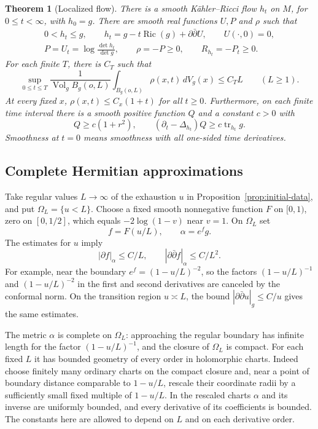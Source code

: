 \documentclass[11pt]{article}
\newtheorem{theorem}{Theorem}[section]
\theoremstyle{definition}
\theoremstyle{remark}
\newcommand{\dd}{\partial\bar\partial}
\DeclareMathOperator{\Ric}{Ric}
\DeclareMathOperator{\tr}{tr}
\DeclareMathOperator{\Vol}{Vol}
\numberwithin{equation}{section}
\begin{document}
\begin{theorem}[Localized flow]\label{thm:localized-flow}
There is a smooth K\"ahler--Ricci flow $h_t$ on $M$, for
$0\le t<\infty$, with $h_0=g$.  There are smooth real functions $U,P$
and $\rho$ such that
\begin{equation}\label{flow:identities}
 \begin{gathered}
 0<h_t\le g,\qquad
 h_t=g-t\Ric(g)+\dd U,\qquad U(\cdot,0)=0,\\
 P=U_t=\log\frac{\det h_t}{\det g},\qquad
 \rho=-P\ge0,\qquad R_{h_t}=-P_t\ge0.
 \end{gathered}
\end{equation}
For each finite $T$, there is $C_T$ such that
\begin{equation}\label{flow:rho-average}
 \sup_{0\le t\le T}
 \frac{1}{\Vol_gB_g(o,L)}\int_{B_g(o,L)}\rho(x,t)\,dV_g(x)
 \le C_TL\qquad(L\ge1).
\end{equation}
At every fixed $x$, $\rho(x,t)\le C_x(1+t)$ for all $t\ge0$.
Furthermore, on each finite time interval there is a smooth positive
function $Q$ and a constant $c>0$ with
\begin{equation}\label{flow:proper-supercaloric}
 Q\ge c(1+r^2),\qquad
 (\partial_t-\Delta_{h_t})Q\ge c\tr_{h_t}g.
\end{equation}
Smoothness at $t=0$ means smoothness with all one-sided time derivatives.
\end{theorem}

\subsection{Complete Hermitian approximations}

Take regular values $L\to\infty$ of the exhaustion $u$ in
Proposition~\ref{prop:initial-data}, and put $\Omega_L=\{u<L\}$.
Choose a fixed smooth nonnegative function $F$ on $[0,1)$, zero on
$[0,1/2]$, which equals $-2\log(1-v)$ near $v=1$.  On $\Omega_L$ set
\[
 f=F(u/L),\qquad \alpha=e^fg.
\]
The estimates for $u$ imply
\begin{equation}\label{flow:conformal-bounds}
 |\partial f|_\alpha\le C/L,
 \qquad |\dd f|_\alpha\le C/L^2.
\end{equation}
For example, near the boundary $e^f=(1-u/L)^{-2}$, so the factors
$(1-u/L)^{-1}$ and $(1-u/L)^{-2}$ in the first and second derivatives
are canceled by the conformal norm.  On the transition region
$u\asymp L$, the bound $|\dd u|_g\le C/u$ gives the same estimates.

The metric $\alpha$ is complete on $\Omega_L$: approaching the regular
boundary has infinite length for the factor $(1-u/L)^{-1}$, and the
closure of $\Omega_L$ is compact.  For each fixed $L$ it has bounded
geometry of every order in holomorphic charts.  Indeed choose finitely
many ordinary charts on the compact closure and, near a point of
boundary distance comparable to $1-u/L$, rescale their coordinate
radii by a sufficiently small fixed multiple of $1-u/L$.  In the
rescaled charts $\alpha$ and its inverse are uniformly bounded, and
every derivative of its coefficients is bounded.  The constants here
are allowed to depend on $L$ and on each derivative order.
\end{document}
